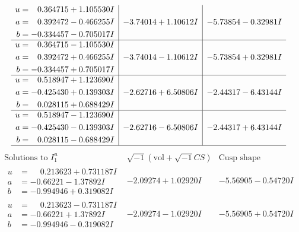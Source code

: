 \documentclass[1p]{elsarticle_modified}
\theoremstyle{definition}
\newcommand{\I}{\sqrt{-1}}
\begin{document}
$$\begin{array}{c|c|c}
\begin{aligned}
u &= \phantom{-}0.364715 + 1.105530 I \\
a &= \phantom{-}0.392472 - 0.466255 I \\
b &= -0.334457 - 0.705017 I\end{aligned}
 & -3.74014 + 1.10612 I & -5.73854 - 0.32981 I \\ \hline\begin{aligned}
u &= \phantom{-}0.364715 - 1.105530 I \\
a &= \phantom{-}0.392472 + 0.466255 I \\
b &= -0.334457 + 0.705017 I\end{aligned}
 & -3.74014 - 1.10612 I & -5.73854 + 0.32981 I \\ \hline\begin{aligned}
u &= \phantom{-}0.518947 + 1.123690 I \\
a &= -0.425430 + 0.139303 I \\
b &= \phantom{-}0.028115 + 0.688429 I\end{aligned}
 & -2.62716 + 6.50806 I & -2.44317 - 6.43144 I \\ \hline\begin{aligned}
u &= \phantom{-}0.518947 - 1.123690 I \\
a &= -0.425430 - 0.139303 I \\
b &= \phantom{-}0.028115 - 0.688429 I\end{aligned}
 & -2.62716 - 6.50806 I & -2.44317 + 6.43144 I\\
 \hline 
 \end{array}$$\newpage$$\begin{array}{c|c|c}  
\text{Solutions to }I^u_{1}& \I (\text{vol} + \sqrt{-1}CS) & \text{Cusp shape}\\
 \hline 
\begin{aligned}
u &= \phantom{-}0.213623 + 0.731187 I \\
a &= -0.66221 - 1.37892 I \\
b &= -0.994946 + 0.319082 I\end{aligned}
 & -2.09274 + 1.02920 I & -5.56905 - 0.54720 I \\ \hline\begin{aligned}
u &= \phantom{-}0.213623 - 0.731187 I \\
a &= -0.66221 + 1.37892 I \\
b &= -0.994946 - 0.319082 I\end{aligned}
 & -2.09274 - 1.02920 I & -5.56905 + 0.54720 I \\ \hline\begin{aligned}

\end{aligned}
\end{array}$$
\end{document}
